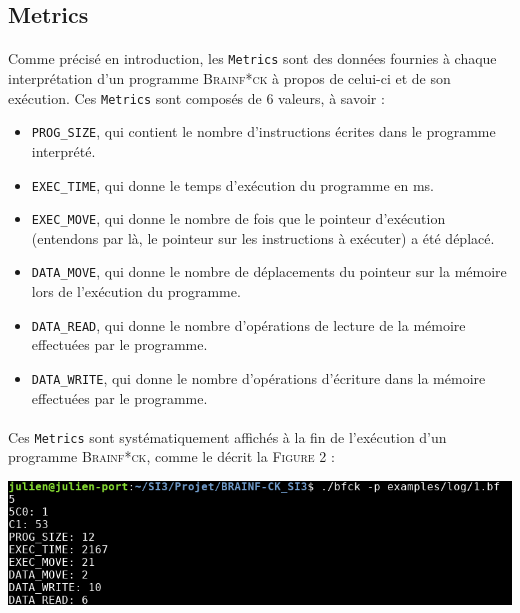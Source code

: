 \documentclass[a4paper]{article}
\begin{document}
\subsection{Metrics}
\paragraph{}Comme précisé en introduction, les \texttt{Metrics} sont des données fournies à chaque interprétation d'un programme \textsc{Brainf*ck} à propos de celui-ci et de son exécution. Ces \texttt{Metrics} sont composés de 6 valeurs, à savoir :
\begin{itemize}
	\item \texttt{PROG\_SIZE}, qui contient le nombre d'instructions écrites dans le programme interprété.
	\item \texttt{EXEC\_TIME}, qui donne le temps d'exécution du programme en ms.
	\item \texttt{EXEC\_MOVE}, qui donne le nombre de fois que le pointeur d'exécution (entendons par là, le pointeur sur les instructions à exécuter) a été déplacé.
	\item \texttt{DATA\_MOVE}, qui donne le nombre de déplacements du pointeur sur la mémoire lors de l'exécution du programme.
	\item \texttt{DATA\_READ}, qui donne le nombre d'opérations de lecture de la mémoire effectuées par le programme.
	\item \texttt{DATA\_WRITE}, qui donne le nombre d'opérations d'écriture dans la mémoire effectuées par le programme.
\end{itemize}

\paragraph{}Ces \texttt{Metrics} sont systématiquement affichés à la fin de l'exécution d'un programme \textsc{Brainf*ck}, comme le décrit la \textsc{Figure 2} :
\begin{center}
	\includegraphics[scale=0.35]{metrics.png}
\end{center}
\end{document}
